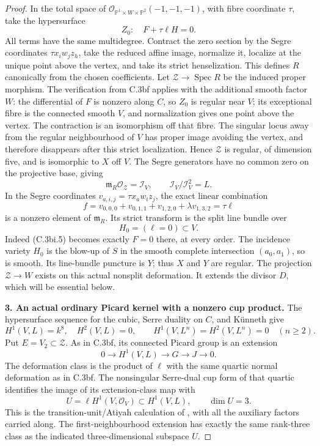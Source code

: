 \begin{proof}
In the total space of
$\mathcal O_{\mathbb P^1\times W\times\mathbb P^2}(-1,-1,-1)$,
with fibre coordinate $\tau$, take the hypersurface
\[
 Z_0:\quad F+\tau\ell H=0.
 \tag{C.3bi.5}
\]
All terms have the same multidegree. Contract the zero section by the
Segre coordinates $\tau x_iw_jz_h$, take the reduced affine image,
normalize it, localize at the unique point above the vertex, and take its
strict henselization. This defines $R$ canonically from the chosen
coefficients. Let $\mathcal Z\to\operatorname{Spec}R$ be the induced
proper morphism. The verification from C.3bf applies with the additional
smooth factor $W$: the differential of $F$ is nonzero along $C$, so
$Z_0$ is regular near $V$; its exceptional fibre is the connected smooth
$V$, and normalization gives one point above the vertex. The contraction
is an isomorphism off that fibre. The singular locus away from the
regular neighbourhood of $V$ has proper image avoiding the vertex, and
therefore disappears after this strict localization. Hence $\mathcal Z$
is regular, of dimension five, and is isomorphic to $X$ off $V$.
The Segre generators have no common zero on the projective base, giving
\[
 \mathfrak m_R\mathcal O_{\mathcal Z}=\mathcal I_V,
 \qquad\mathcal I_V/\mathcal I_V^2=L.
 \tag{C.3bi.6}
\]
In the Segre coordinates $v_{a,i,j}=\tau x_aw_iz_j$, the exact
linear combination
\[
 f=v_{0,0,0}+v_{0,1,1}+v_{1,2,0}+\lambda v_{1,3,2}=\tau\ell
\]
is a
nonzero element of $\mathfrak m_R$. Its strict transform is the split
line bundle over
\[
 H_0=(\ell=0)\subset V.
\]
Indeed (C.3bi.5) becomes exactly $F=0$ there, at every order. The
incidence variety $H_0$ is the blow-up of $S$ in the smooth complete
intersection $(a_0,a_1)$, so is smooth. Its line-bundle puncture is $Y$;
thus $X$ and $Y$ are regular. The projection $\mathcal Z\to W$
exists on this actual nonsplit deformation. It extends the divisor $D$,
which will be essential below.

\textbf{3. An actual ordinary Picard kernel with a nonzero cup product.}
The hypersurface sequence for the cubic, Serre duality on $C$, and
K\"unneth give
\[
 H^1(V,L)=k^8,\quad H^2(V,L)=0,\qquad
 H^1(V,L^n)=H^2(V,L^n)=0\quad(n\ge2).
 \tag{C.3bi.7}
\]
Put $E=V_2\subset\mathcal Z$. As in C.3bf, its connected Picard group
is an extension
\[
 0\longrightarrow H^1(V,L)\longrightarrow G
 \longrightarrow J\longrightarrow0.
 \tag{C.3bi.8}
\]
The deformation class is the product of $\ell$ with the same quartic
normal deformation as in C.3bf. The nonsingular Serre-dual cup form of
that quartic identifies the image of its extension-class map with
\[
 U=\ell H^1(V,\mathcal O_V)\subset H^1(V,L),\qquad\dim U=3.
\]
This is the transition-unit/Atiyah calculation of
\citet[Theorem 2.6 and formula (2.7.2)]{D_Illusie1972Torsors}, with
all the auxiliary factors carried along. The first-neighbourhood
extension has exactly the same rank-three class as the indicated
three-dimensional subspace $U$.


\end{proof}
